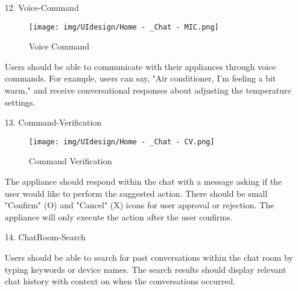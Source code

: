 \documentclass[conference]{IEEEtran}
\begin{document}
\begin{enumerate}
\begin{itemize}
\begin{itemize}
\begin{enumerate}
\begin{enumerate}
    \item[12.] Voice-Command
    \begin{figure}[h]
        {\centering
        \hspace{4cm}
        \begin{minipage}{0.4\columnwidth}
            \texttt{[image: img/UIdesign/Home - \_Chat - MIC.png]}
            \caption{Voice Command}
        \end{minipage}}
    \end{figure}
    
    Users should be able to communicate with their appliances through voice commands. For example, users can say, "Air conditioner, I'm feeling a bit warm," and receive conversational responses about adjusting the temperature settings. \\
\end{enumerate}

\begin{enumerate}
    \item[13.] Command-Verification
    \begin{figure}[h]
        {\centering
        \hspace{4cm}
        \begin{minipage}{0.4\columnwidth}
            \texttt{[image: img/UIdesign/Home - \_Chat - CV.png]}
            \caption{Command Verification}
        \end{minipage}}
    \end{figure}
    
    The appliance should respond within the chat with a message asking if the user would like to perform the suggested action. There should be small "Confirm" (O) and "Cancel" (X) icons for user approval or rejection. The appliance will only execute the action after the user confirms. \\ 
\end{enumerate}

\begin{enumerate}
    \item[14.] ChatRoom-Search
    
    Users should be able to search for past conversations within the chat room by typing keywords or device names. The search results should display relevant chat history with context on when the conversations occurred. \\ 
\end{enumerate}


\end{enumerate}
\end{itemize}
\end{itemize}
\end{enumerate}
\end{document}
